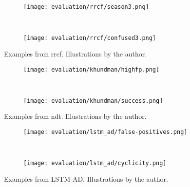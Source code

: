 \begin{figure}[htp!]
    \begin{subfigure}[b]{\linewidth}
        \centering
        \texttt{[image: evaluation/rrcf/season3.png]}
    \end{subfigure}%
    \\
    \begin{subfigure}[b]{\linewidth}
        \centering
        \texttt{[image: evaluation/rrcf/confused3.png]}
    \end{subfigure}
    \caption[Examples from \gls{rrcf}.]{Examples from \gls{rrcf}. Illustrations by the author.}\label{fig:rrcf-output}
\end{figure}

\begin{figure}[htp!]
    \begin{subfigure}[b]{\linewidth}
        \centering
        \texttt{[image: evaluation/khundman/highfp.png]}
        \label{fig:khundman-fp}
    \end{subfigure}%
    \\
    \begin{subfigure}[b]{\linewidth}
        \centering
        \texttt{[image: evaluation/khundman/success.png]}
        \label{fig:khundman-success}
    \end{subfigure}
    \caption[Examples from \gls{ndt}.]{Examples from \gls{ndt}. Illustrations by the author.}\label{fig:khundman-output}
\end{figure}

\begin{figure}[htp!]
    \begin{subfigure}[b]{\linewidth}
        \centering
        \texttt{[image: evaluation/lstm\_ad/false-positives.png]}
        \label{fig:lstmad-fp}
    \end{subfigure}%
    \\
    \begin{subfigure}[b]{\linewidth}
        \centering
        \texttt{[image: evaluation/lstm\_ad/cyclicity.png]}
        \label{fig:lstmad-cyclicity}
    \end{subfigure}
    \caption[Examples from LSTM-AD.]{Examples from LSTM-AD\@. Illustrations by the author.}\label{fig:lstmad-output}
\end{figure}

